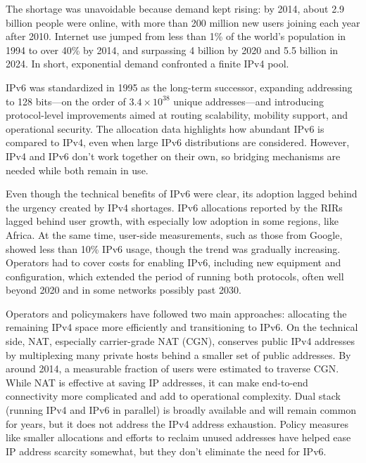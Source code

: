 The shortage was unavoidable because demand kept rising: by 2014, about 2.9 billion people were online, with more than 200 million new users joining each year after 2010. Internet use jumped from less than 1\% of the world’s population in 1994 to over 40\% by 2014, and surpassing 4 billion by 2020 and 5.5 billion in 2024\cite{7737362, itu_d_statistics}. In short, exponential demand confronted a finite IPv4 pool.

IPv6 was standardized in 1995 as the long-term successor, expanding addressing to 128 bits—on the order of $3.4 \times 10^{38}$ unique addresses—and introducing protocol-level improvements aimed at routing scalability, mobility support, and operational security\cite{rfc1883,7737362,LEVIN20141059}. The allocation data highlights how abundant IPv6 is compared to IPv4, even when large IPv6 distributions are considered\cite{7737362}. However, IPv4 and IPv6 don't work together on their own, so bridging mechanisms are needed while both remain in use\cite{LEVIN20141059}.


Even though the technical benefits of IPv6 were clear, its adoption lagged behind the urgency created by IPv4 shortages. IPv6 allocations reported by the RIRs lagged behind user growth, with especially low adoption in some regions, like Africa. At the same time, user-side measurements, such as those from Google, showed less than 10\% IPv6 usage, though the trend was gradually increasing\cite{7737362}. Operators had to cover costs for enabling IPv6, including new equipment and configuration, which extended the period of running both protocols, often well beyond 2020 and in some networks possibly past 2030\cite{7737362}.

Operators and policymakers have followed two main approaches: allocating the remaining IPv4 space more efficiently and transitioning to IPv6\cite{LEVIN20141059}. On the technical side, NAT, especially carrier-grade NAT (CGN), conserves public IPv4 addresses by multiplexing many private hosts behind a smaller set of public addresses\cite{rfc2663}. By around 2014, a measurable fraction of users were estimated to traverse CGN\cite{livadariu2018inferring}. While NAT is effective at saving IP addresses, it can make end-to-end connectivity more complicated and add to operational complexity\cite{rfc2993}. 
Dual stack (running IPv4 and IPv6 in parallel) is broadly available and will remain common for years, but it does not address the IPv4 address exhaustion\cite{LEVIN20141059}. Policy measures like smaller allocations and efforts to reclaim unused addresses have helped ease IP address scarcity somewhat, but they don't eliminate the need for IPv6\cite{LEVIN20141059}.

